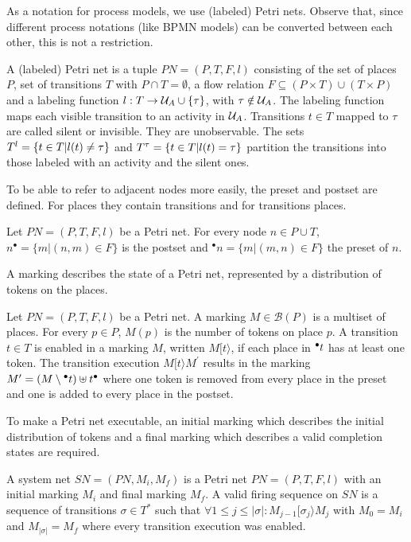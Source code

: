 As a notation for process models, we use (labeled) Petri nets. Observe that, since different process notations (like BPMN models) can be converted between each other, this is not a restriction.
\begin{definition}
A (labeled) Petri net is a tuple $PN=(P,T,F,l)$ consisting of the set of places $P$, set of transitions $T$ with $P \cap T = \emptyset$, a flow relation $F\subseteq (P \times T) \cup (T \times P)$ and a labeling function $l:T \to \mathcal{U}_A \cup \{ \tau \}$, with $\tau \notin \mathcal{U}_A$. The labeling function maps each visible transition to an activity in $\mathcal{U}_A$. Transitions $t\in T$ mapped to $\tau$ are called silent or invisible. They are unobservable. The sets $T^l=\{t\in T|l(t)\neq \tau\}$ and $T^{\tau}=\{t\in T|l(t)=\tau\}$ partition the transitions into those labeled with an activity and the silent ones.
\end{definition}
To be able to refer to adjacent nodes more easily, the preset and postset are defined. For places they contain transitions and for transitions places.
\begin{definition}
Let $PN=(P,T,F,l)$ be a Petri net. For every node $n\in P \cup T$, $n^\bullet=\{m | (n, m) \in F\}$ is the postset and $^{\bullet}n=\{m | (m, n) \in F\}$ the preset of $n$.
\end{definition}
A marking describes the state of a Petri net, represented by a distribution of tokens on the places.
\begin{definition}[Marking]
Let $PN=(P,T,F,l)$ be a Petri net. A marking $M\in \mathcal{B}(P)$ is a multiset of places. For every $p\in P$, $M(p)$ is the number of tokens on place $p$. A transition $t\in T$ is enabled in a marking $M$, written $M[t \rangle$, if each place in ${^{\bullet}t}$ has at least one token. The transition execution $M[t \rangle M^\prime$ results in the marking $M^\prime = (M \setminus {^{\bullet}t}) \uplus t^{\bullet}$ where one token is removed from every place in the preset and one is added to every place in the postset.
\end{definition}
To make a Petri net executable, an initial marking which describes the initial distribution of tokens and a final marking which describes a valid completion states are required.
\begin{definition}
A system net $SN=(PN,M_i,M_f)$ is a Petri net $PN=(P,T,F,l)$ with an initial marking $M_i$ and final marking $M_f$. A valid firing sequence on $SN$ is a sequence of transitions $\sigma \in T^*$ such that $\forall 1\le j \le |\sigma| : M_{j-1}[\sigma_j \rangle M_{j}$ with $M_0=M_i$ and $M_{|\sigma|}=M_f$ where every transition execution was enabled.
\end{definition}

